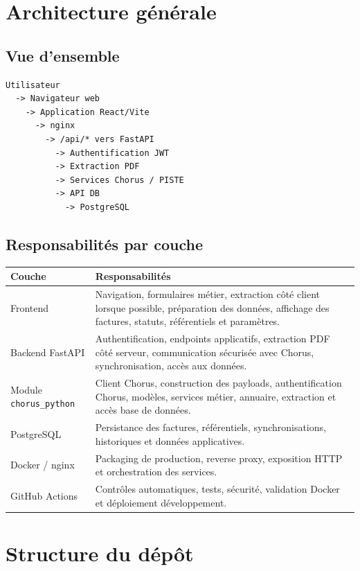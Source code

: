 \documentclass[11pt,a4paper]{article}
\begin{document}
\section{Architecture générale}

\subsection{Vue d'ensemble}

\begin{lstlisting}
Utilisateur
  -> Navigateur web
    -> Application React/Vite
      -> nginx
        -> /api/* vers FastAPI
          -> Authentification JWT
          -> Extraction PDF
          -> Services Chorus / PISTE
          -> API DB
            -> PostgreSQL
\end{lstlisting}

\subsection{Responsabilités par couche}

\begin{longtable}{|p{}|p{}|}
  \hline
  \textbf{Couche} & \textbf{Responsabilités} \\
  \hline
  Frontend &
  Navigation, formulaires métier, extraction côté client lorsque possible,
  préparation des données, affichage des factures, statuts, référentiels et
  paramètres. \\
  \hline
  Backend FastAPI &
  Authentification, endpoints applicatifs, extraction PDF côté serveur,
  communication sécurisée avec Chorus, synchronisation, accès aux données. \\
  \hline
  Module \texttt{chorus\_python} &
  Client Chorus, construction des payloads, authentification Chorus, modèles,
  services métier, annuaire, extraction et accès base de données. \\
  \hline
  PostgreSQL &
  Persistance des factures, référentiels, synchronisations, historiques et
  données applicatives. \\
  \hline
  Docker / nginx &
  Packaging de production, reverse proxy, exposition HTTP et orchestration des
  services. \\
  \hline
  GitHub Actions &
  Contrôles automatiques, tests, sécurité, validation Docker et déploiement
  développement. \\
  \hline
\end{longtable}

\section{Structure du dépôt}
\end{document}
